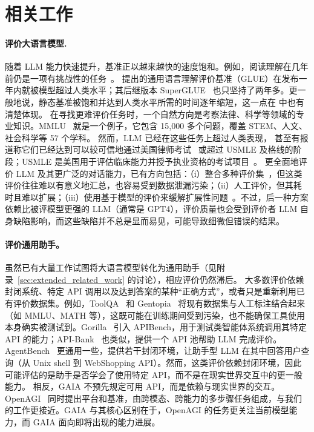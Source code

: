 \documentclass{fairmeta}
\newcommand{\benchmark}{\textsc{GAIA}}
\begin{document}
\section{相关工作}
\paragraph{评价大语言模型.} 随着 LLM 能力快速提升，基准正以越来越快的速度饱和。例如，阅读理解在几年前仍是一项有挑战性的任务~\citep{rajpurkar2016squad}。\citet{_wang-etal-2018-glue} 提出的通用语言理解评价基准（GLUE）在发布一年内就被模型超过人类水平；其后继版本 SuperGLUE~\citep{_wang-etal-2019-superglue} 也只坚持了两年多。更一般地说，静态基准被饱和并达到人类水平所需的时间逐年缩短，这一点在 \citet{_kiela-etal-2023-plottingprogress} 中也有清楚体现。
在寻找更难评价任务时，一个自然方向是考察法律、科学等领域的专业知识。MMLU~\citep{_hendrycks-etal-2021-measuring-mmlu} 就是一个例子，它包含 15,000 多个问题，覆盖 STEM、人文、社会科学等 57 个学科。
然而，LLM 已经在这些任务上超过人类表现，
甚至有报道称它们已经达到可以较可信地通过美国律师考试~\citep{openai2023gpt4} 或超过 USMLE 及格线的阶段；USMLE 是美国用于评估临床能力并授予执业资格的考试项目~\citep{nori2023capabilities}。
更全面地评价 LLM 及其更广泛的对话能力，已有方向包括：（i）整合多种评价集~\citep{_gao-etal-2021-harness,_liang-etal-2022-holistic,_srivastava-etal-2023-bigbench}，但这类评价往往难以有意义地汇总，也容易受到数据泄漏污染；（ii）人工评价，但其耗时且难以扩展；（iii）使用基于模型的评价来缓解扩展性问题~\citep{zheng2023judging}。不过，后一种方案依赖比被评模型更强的 LLM（通常是 GPT4），评价质量也会受到评价者 LLM 自身缺陷影响，而这些缺陷并不总是显而易见，可能导致细微但错误的结果。


\paragraph{评价通用助手。}
虽然已有大量工作试图将大语言模型转化为通用助手（见附录~\ref{sec:extended_related_work} 的讨论），相应评价仍然滞后。
大多数评价依赖封闭系统、特定 API 调用以及达到答案的某种“正确方式”，或者只是重新利用已有评价数据集。例如，ToolQA~\citep{_zhuang-etal-2023-toolqa} 和 Gentopia~\citep{_xu-etal-2023-gentopia} 将现有数据集与人工标注结合起来（如 MMLU、MATH 等），这既可能在训练期间受到污染，也不能确保工具使用本身确实被测试到。Gorilla~\citep{_patil-etal-2023-gorilla} 引入 APIBench，用于测试类智能体系统调用其特定 API 的能力；API-Bank~\citep{_li-etal-2023-apibank} 也类似，提供一个 API 池帮助 LLM 完成评价。AgentBench~\citep{liu2023agentbench} 更通用一些，提供若干封闭环境，让助手型 LLM 在其中回答用户查询（从 Unix shell 到 WebShopping API）。然而，这类评价依赖封闭环境，因此可能评估的是助手是否学会了使用特定 API，而不是在现实世界交互中的更一般能力。
相反，\benchmark{} 不预先规定可用 API，而是依赖与现实世界的交互。
OpenAGI~\citep{_ge_2023_openagi} 同时提出平台和基准，由跨模态、跨能力的多步骤任务组成，与我们的工作更接近。\benchmark{} 与其核心区别在于，OpenAGI 的任务更关注当前模型能力，而 \benchmark{} 面向即将出现的能力进展。
\end{document}
